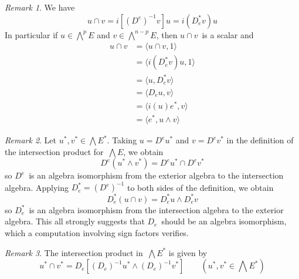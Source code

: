 \documentclass[letterpaper,12pt]{article}
\newcommand{\sect}{\cap}
\newcommand{\eprod}{\wedge}
\newcommand{\bigeprod}{\bigwedge}
\newcommand{\medeprod}{{\textstyle\bigeprod}}
\newcommand{\sprod}[2]{\langle#1,#2\rangle}
\theoremstyle{definition}
\theoremstyle{remark}
\newtheorem*{rmk}{Remark}
\begin{document}
\begin{rmk}
We have
\[u\sect v=i[(D^e)^{-1}v]u=i(D_e^* v)u\]
In particular if \(u\in\medeprod^p E\) and \(v\in\medeprod^{n-p}E\), then \(u\sect v\)~is a scalar and
\begin{align*}
u\sect v&=\sprod{u\sect v}{1}\\
	&=\sprod{i(D_e^* v)u}{1}\\
	&=\sprod{u}{D_e^* v}\\
	&=\sprod{D_e u}{v}\\
	&=\sprod{i(u)e^*}{v}\\
	&=\sprod{e^*}{u\eprod v}
\end{align*}
\end{rmk}

\begin{rmk}
Let \(u^*,v^*\in\medeprod E^*\). Taking \(u=D^e u^*\) and \(v=D^e v^*\) in the definition of the intersection product for~\(\medeprod E\), we obtain
\[D^e(u^*\eprod v^*)=D^e u^*\sect D^e v^*\]
so \(D^e\)~is an algebra isomorphism from the exterior algebra to the intersection algebra. Applying \(D_e^*=(D^e)^{-1}\) to both sides of the definition, we obtain
\[D_e^*(u\sect v)=D_e^* u\eprod D_e^* v\]
so \(D_e^*\)~is an algebra isomorphism from the intersection algebra to the exterior algebra. This all strongly suggests that \(D_e\)~should be an algebra isomorphism, which a computation involving sign factors verifies.
\end{rmk}

\begin{rmk}
The intersection product in~\(\medeprod E^*\) is given by
\[u^*\sect v^*=D_e[(D_e)^{-1}u^*\eprod(D_e)^{-1}v^*]\qquad(u^*,v^*\in\medeprod E^*)\]
\end{rmk}
\end{document}

